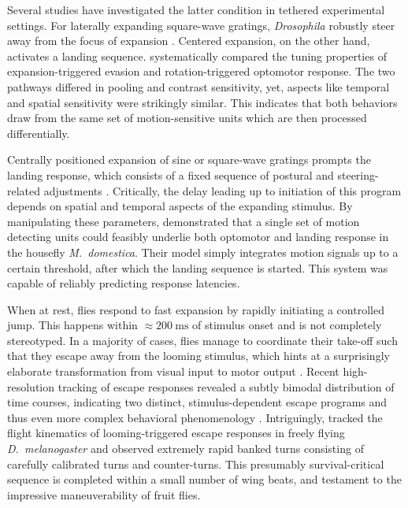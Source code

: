 Several studies have investigated the latter condition in tethered experimental settings. For laterally expanding square-wave gratings, \textit{Drosophila} robustly steer away from the focus of expansion \citep{Tammero:2002aa}. Centered expansion, on the other hand, activates a landing sequence. \citet{Duistermars:2007aa} systematically compared the tuning properties of expansion-triggered evasion and rotation-triggered optomotor response. The two pathways differed in pooling and contrast sensitivity, yet, aspects like temporal and spatial sensitivity were strikingly similar. This indicates that both behaviors draw from the same set of motion-sensitive units which are then processed differentially.

Centrally positioned expansion of sine or square-wave gratings prompts the landing response, which consists of a fixed sequence of postural and steering-related adjustments \citep{Braitenberg:1966aa,Goodman:1960aa,Borst:1986wx}. Critically, the delay leading up to initiation of this program depends on spatial and temporal aspects of the expanding stimulus. By manipulating these parameters, \citet{Bahde:1986eh} demonstrated that a single set of motion detecting units could feasibly underlie both optomotor and landing response in the housefly \textit{M.\ domestica}. Their model simply integrates motion signals up to a certain threshold, after which the landing sequence is started. This system was capable of reliably predicting response latencies.

When at rest, flies respond to fast expansion by rapidly initiating a controlled jump. This happens within $\approx\SI{200}{\milli\second}$ of stimulus onset and is not completely stereotyped. In a majority of cases, flies manage to coordinate their take-off such that they escape away from the looming stimulus, which hints at a surprisingly elaborate transformation from visual input to motor output \citep{Card:2008aa}. Recent high-resolution tracking of escape responses revealed a subtly bimodal distribution of time courses, indicating two distinct, stimulus-dependent escape programs and thus even more complex behavioral phenomenology \citep{Reyn:2014aa}. Intriguingly, \citet{Muijres:2014aa} tracked the flight kinematics of looming-triggered escape responses in freely flying \textit{D.\ melanogaster} and observed extremely rapid banked turns consisting of carefully calibrated turns and counter-turns. This presumably survival-critical sequence is completed within a small number of wing beats, and testament to the impressive maneuverability of fruit flies.

